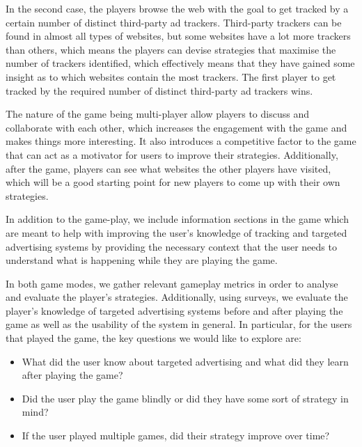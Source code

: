 \documentclass{l4proj}
\begin{document}
In the second case, the players browse the web with the goal to get tracked by a certain number of distinct third-party ad trackers. Third-party trackers can be found in almost all types of websites, but some websites have a lot more trackers than others, which means the players can devise strategies that maximise the number of trackers identified, which effectively means that they have gained some insight as to which websites contain the most trackers. The first player to get tracked by the required number of distinct third-party ad trackers wins.

The nature of the game being multi-player allow players to discuss and collaborate with each other, which increases the engagement with the game and makes things more interesting. It also introduces a competitive factor to the game that can act as a motivator for users to improve their strategies.  Additionally, after the game, players can see what websites the other players have visited, which will be a good starting point for new players to come up with their own strategies.

In addition to the game-play, we include information sections in the game which are meant to help with improving the user's knowledge of tracking and targeted advertising systems by providing the necessary context that the user needs to understand what is happening while they are playing the game.     

In both game modes, we gather relevant gameplay metrics in order to analyse and evaluate the player's strategies. Additionally, using surveys, we evaluate the player's knowledge of targeted advertising systems before and after playing the game as well as the usability of the system in general. In particular, for the users that played the game, the key questions we would like to explore are:
\begin{itemize}
    \item
    What did the user know about targeted advertising and what did they learn after playing the game?
    \item
    Did the user play the game blindly or did they have some sort of strategy in mind?
    \item
    If the user played multiple games, did their strategy improve over time?
\end{itemize}
\end{document}
